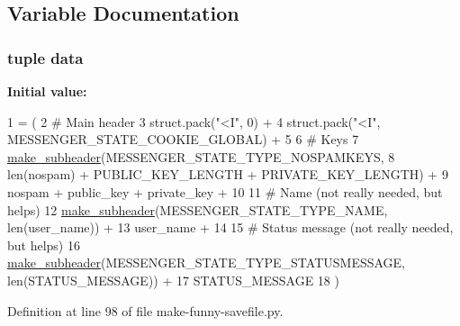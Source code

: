 \subsection{Variable Documentation}
\hypertarget{namespacemake-funny-savefile_aa7a0efb8690a34f61a95b00cc723ca27}{
\subsubsection[{data}]{\setlength{\rightskip}{0pt plus 5cm}tuple data}}\label{namespacemake-funny-savefile_aa7a0efb8690a34f61a95b00cc723ca27}
{\bfseries Initial value\+:}
\begin{DoxyCode}
1 = (
2     \textcolor{comment}{# Main header}
3     struct.pack(\textcolor{stringliteral}{"<I"}, 0) +
4     struct.pack(\textcolor{stringliteral}{"<I"}, MESSENGER\_STATE\_COOKIE\_GLOBAL) +
5 
6     \textcolor{comment}{# Keys}
7     \hyperlink{namespacemake-funny-savefile_aaed87108d49264902998e8dfdc4c2f53}{make\_subheader}(MESSENGER\_STATE\_TYPE\_NOSPAMKEYS,
8         len(nospam) + PUBLIC\_KEY\_LENGTH + PRIVATE\_KEY\_LENGTH) +
9     nospam + public\_key + private\_key +
10 
11     \textcolor{comment}{# Name (not really needed, but helps)}
12     \hyperlink{namespacemake-funny-savefile_aaed87108d49264902998e8dfdc4c2f53}{make\_subheader}(MESSENGER\_STATE\_TYPE\_NAME, len(user\_name)) +
13     user\_name +
14 
15     \textcolor{comment}{# Status message (not really needed, but helps)}
16     \hyperlink{namespacemake-funny-savefile_aaed87108d49264902998e8dfdc4c2f53}{make\_subheader}(MESSENGER\_STATE\_TYPE\_STATUSMESSAGE, len(STATUS\_MESSAGE)) +
17     STATUS\_MESSAGE
18 )
\end{DoxyCode}


Definition at line 98 of file make-\/funny-\/savefile.\+py.



